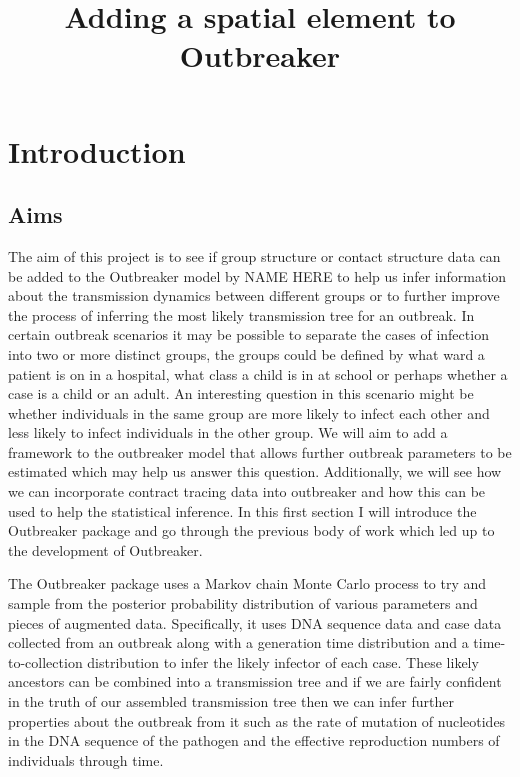 \documentclass{article}
\title{Adding a spatial element to Outbreaker}
\begin{document}
\maketitle

\section{Introduction}
\subsection{Aims}
The aim of this project is to see if group structure or contact structure data can be added to the Outbreaker model by NAME HERE to help us infer information about the transmission dynamics between different groups or to further improve the process of inferring the most likely transmission tree for an outbreak. In certain outbreak scenarios it may be possible to separate the cases of infection into two or more distinct groups, the groups could be defined by what ward a patient is on in a hospital, what class a child is in at school or perhaps whether a case is a child or an adult. An interesting question in this scenario might be whether individuals in the same group are more likely to infect each other and less likely to infect individuals in the other group. We will aim to add a framework to the outbreaker model that allows further outbreak parameters to be estimated which may help us answer this question. Additionally, we will see how we can incorporate contract tracing data into outbreaker and how this can be used to help the statistical inference. In this first section I will introduce the Outbreaker package and go through the previous body of work which led up to the development of Outbreaker.

The Outbreaker package uses a Markov chain Monte Carlo process to try and sample from the posterior probability distribution of various parameters and pieces of augmented data. Specifically, it uses DNA sequence data and case data collected from an outbreak along with a generation time distribution and a time-to-collection distribution to infer the likely infector of each case. These likely ancestors can be combined into a transmission tree and if we are fairly confident in the truth of our assembled transmission tree then we can infer further properties about the outbreak from it such as the rate of mutation of nucleotides in the DNA sequence of the pathogen and the effective reproduction numbers of individuals through time.
\end{document}
